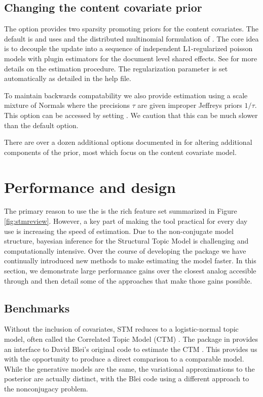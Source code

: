 \documentclass[article,shortnames]{jss}
\begin{document}
\subsection{Changing the content covariate prior}
The  option provides two sparsity promoting priors for the content covariates.  The default is  and uses  and the distributed multinomial formulation of \citet{taddy2013distributed}.  The core idea is to decouple the update into a sequence of independent L1-regularized poisson models with plugin estimators for the document level shared effects.  See \citet{stmjasa} for more details on the estimation procedure. The regularization parameter is set automatically as detailed in the  help file.

To maintain backwards compatability we also provide estimation using a scale mixture of Normals where the precisions $\tau$ are given improper Jeffreys priors $1/\tau$. This option can be accessed by setting .  We caution that this can be much slower than the default option.

There are over a dozen additional options documented in  for altering additional components of the prior, most which focus on the content covariate model.

\section{Performance and design}
\label{sec:performance}
The primary reason to use the  is the rich feature set summarized in Figure \ref{fig:stmreview}.  However, a key part of making the tool practical for every day use is increasing the speed of estimation.  Due to the non-conjugate model structure, bayesian inference for the Structural Topic Model is challenging and computationally intensive. Over the course of developing the  package we have continually introduced new methods to make estimating the model faster. In this section, we demonstrate large performance gains over the closest analog accesible through  and then detail some of the approaches that make those gains possible.

\subsection{Benchmarks}
Without the inclusion of covariates, STM reduces to a logistic-normal topic model, often called the Correlated Topic Model (CTM) \citep{blei2007correlated}. The  package in  provides an interface to David Blei's original  code to estimate the CTM \citep{hornik2011topicmodels}.  This provides us with the opportunity to produce a direct comparison to a comparable model.  While the generative models are the same, the variational approximations to the posterior are actually distinct, with the Blei code using a different approach to the nonconjugacy problem.
\end{document}

